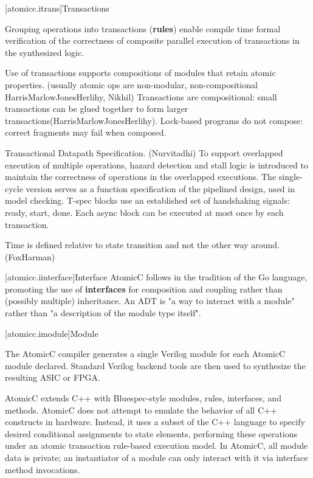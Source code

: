 [atomicc.itrans]{Transactions}

Grouping operations into transactions (\textbf{rules})
enable compile time formal verification of the correctness of
composite parallel execution of transactions
in the synthesized logic.

Use of transactions supports compositions of modules that 
retain atomic properties.  (usually atomic ops are non-modular, non-compositional
HarrisMarlowJonesHerlihy, Nikhil)
Transactions are compositional: small transactions can be glued together to form 
larger transactions(HarrisMarlowJonesHerlihy).
Lock-based programs do not compose: correct fragments may fail when composed.

Transactional Datapath Specification.  (Nurvitadhi)
To support overlapped execution of multiple operations,
hazard detection and stall logic is introduced to maintain
the correctness of operations in the overlapped executions.
The single-cycle version serves as a function specification of the pipelined
design, used in model checking.
T-spec blocks use an established set of handshaking signals: ready, start, done.
Each async block can be executed at most once by each transaction.

Time is defined relative to state transition and not the other way around.
(FoxHarman)

[atomicc.iinterface]{Interface}
AtomicC follows in the tradition of the Go language\cite{Pike2012},
promoting the use of \textbf{interfaces} for composition and
coupling rather than (possibly multiple) inheritance.
An ADT is "a way to interact with a module" rather than "a description
of the module type itself".

[atomicc.imodule]{Module}

The AtomicC compiler 
generates a single Verilog module for each AtomicC module declared.
Standard Verilog backend tools are then used to synthesize
the resulting ASIC or FPGA.

AtomicC extends C++
with Bluespec-style\cite{Bluespec:www,Hoe:Thesis,HoeArvind:TRS_Synthesis2}
modules, rules, interfaces, and methods.
AtomicC does not attempt to emulate the behavior of all C++ constructs in hardware.
Instead, it uses a subset of the C++ language to specify desired
conditional assignments to state elements,
performing these operations under an atomic transaction rule-based execution model.
In AtomicC, all module data is private; an instantiator of a module can only 
interact with it via interface method invocations.

